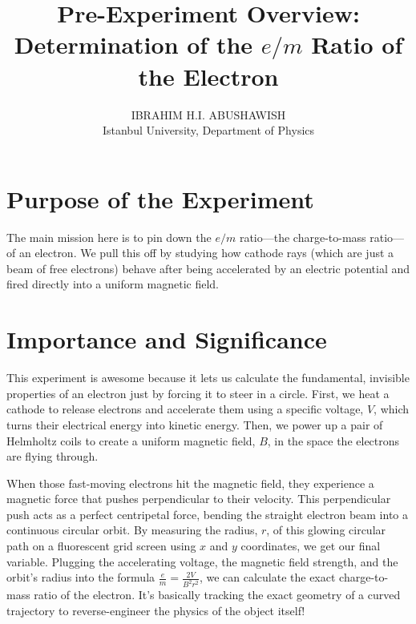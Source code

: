 \documentclass[11pt,a4paper]{article}
\title{\textbf{Pre-Experiment Overview:\\ Determination of the $e/m$ Ratio of the Electron}}
\author{IBRAHIM H.I. ABUSHAWISH \\ Istanbul University, Department of Physics}
\date{}
\begin{document}
\maketitle

\section*{Purpose of the Experiment}
The main mission here is to pin down the $e/m$ ratio---the charge-to-mass ratio---of an electron. We pull this off by studying how cathode rays (which are just a beam of free electrons) behave after being accelerated by an electric potential and fired directly into a uniform magnetic field.

\section*{Importance and Significance}
This experiment is awesome because it lets us calculate the fundamental, invisible properties of an electron just by forcing it to steer in a circle. First, we heat a cathode to release electrons and accelerate them using a specific voltage, $V$, which turns their electrical energy into kinetic energy. Then, we power up a pair of Helmholtz coils to create a uniform magnetic field, $B$, in the space the electrons are flying through.

When those fast-moving electrons hit the magnetic field, they experience a magnetic force that pushes perpendicular to their velocity. This perpendicular push acts as a perfect centripetal force, bending the straight electron beam into a continuous circular orbit. By measuring the radius, $r$, of this glowing circular path on a fluorescent grid screen using $x$ and $y$ coordinates, we get our final variable. Plugging the accelerating voltage, the magnetic field strength, and the orbit's radius into the formula $\frac{e}{m} = \frac{2V}{B^2 r^2}$, we can calculate the exact charge-to-mass ratio of the electron. It's basically tracking the exact geometry of a curved trajectory to reverse-engineer the physics of the object itself!
\end{document}
